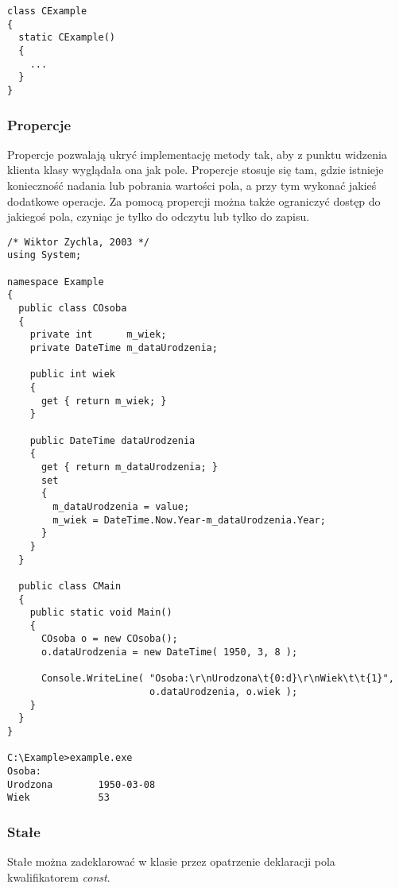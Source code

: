 \begin{scriptsize}
\begin{verbatim}
class CExample
{
  static CExample()
  {
    ...
  }
}
\end{verbatim}
\end{scriptsize}

\subsubsection{Propercje}

Propercje pozwalają ukryć implementację metody tak, aby z punktu widzenia klienta klasy 
wyglądała ona jak pole. Propercje stosuje się tam, gdzie istnieje konieczność nadania
lub pobrania wartości pola, a przy tym wykonać jakieś dodatkowe operacje. Za pomocą propercji można
także ograniczyć dostęp do jakiegoś pola, czyniąc je tylko do odczytu lub tylko do zapisu.

\begin{scriptsize}
\begin{verbatim}
/* Wiktor Zychla, 2003 */
using System;

namespace Example
{
  public class COsoba
  {
    private int      m_wiek;
    private DateTime m_dataUrodzenia;
	
    public int wiek
    {
      get { return m_wiek; }
    }

    public DateTime dataUrodzenia
    {
      get { return m_dataUrodzenia; }
      set 
      {
        m_dataUrodzenia = value;
        m_wiek = DateTime.Now.Year-m_dataUrodzenia.Year;
      }
    }
  }

  public class CMain
  {    
    public static void Main()
    {
      COsoba o = new COsoba();
      o.dataUrodzenia = new DateTime( 1950, 3, 8 );

      Console.WriteLine( "Osoba:\r\nUrodzona\t{0:d}\r\nWiek\t\t{1}", 
                         o.dataUrodzenia, o.wiek );
    }
  }
}

C:\Example>example.exe
Osoba:
Urodzona        1950-03-08
Wiek            53
\end{verbatim}
\end{scriptsize}

\subsubsection{Stałe}

Stałe można zadeklarować w klasie przez opatrzenie deklaracji pola kwalifikatorem {\em const}.

